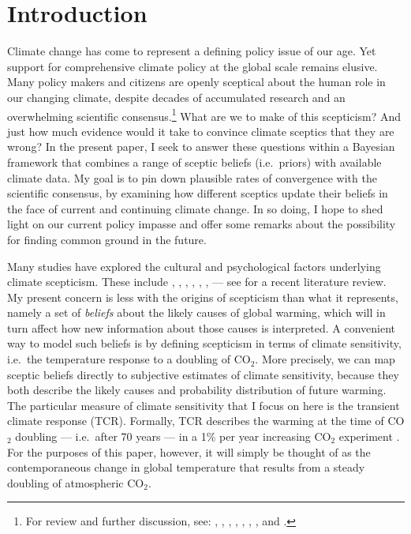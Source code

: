 \documentclass[smallextended]{svjour3}       %
\begin{document}
\hypertarget{sec:intro}{%
\section{Introduction}\label{sec:intro}}

Climate change has come to represent a defining policy issue of our age.
Yet support for comprehensive climate policy at the global scale remains
elusive. Many policy makers and citizens are openly sceptical about the
human role in our changing climate, despite decades of accumulated
research and an overwhelming scientific consensus.\footnote{For review
  and further discussion, see: \cite{oreskes2004beyond},
  \cite{anderegg2010expert}, \cite{doran2011examining},
  \cite{cook2013quantifying}, \cite{verheggen2014scientists},
  \cite{tol2014quantifying}, \cite{cook2016consensus}, and
  \cite{saad2019americans}.} What are we to make of this scepticism? And
just how much evidence would it take to convince climate sceptics that
they are wrong? In the present paper, I seek to answer these questions
within a Bayesian framework that combines a range of sceptic beliefs
(i.e.~priors) with available climate data. My goal is to pin down
plausible rates of convergence with the scientific consensus, by
examining how different sceptics update their beliefs in the face of
current and continuing climate change. In so doing, I hope to shed light
on our current policy impasse and offer some remarks about the
possibility for finding common ground in the future.

Many studies have explored the cultural and psychological factors
underlying climate scepticism. These include \cite{kahan2011cultural},
\cite{kahan2012polarizing}, \cite{mccright2011cool},
\cite{mccright2011politicization}, \cite{corner2012uncertainty},
\cite{ranney2012changing}, \cite{clark2013knowledge} --- see
\cite{hornsey2016meta} for a recent literature review. My present
concern is less with the origins of scepticism than what it represents,
namely a set of \emph{beliefs} about the likely causes of global
warming, which will in turn affect how new information about those
causes is interpreted. A convenient way to model such beliefs is by
defining scepticism in terms of climate sensitivity, i.e.~the
temperature response to a doubling of CO\(_2\). More precisely, we can
map sceptic beliefs directly to subjective estimates of climate
sensitivity, because they both describe the likely causes and
probability distribution of future warming. The particular measure of
climate sensitivity that I focus on here is the transient climate
response (TCR). Formally, TCR describes the warming at the time of
CO\(_2\) doubling --- i.e.~after 70 years --- in a 1\% per year
increasing CO\(_2\) experiment \cite{ipcc2013i}. For the purposes of
this paper, however, it will simply be thought of as the contemporaneous
change in global temperature that results from a steady doubling of
atmospheric CO\(_2\).
\end{document}
